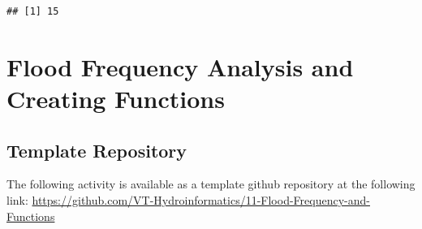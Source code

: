 \documentclass[
]{book}
\newenvironment{Shaded}{\begin{snugshade}}{\end{snugshade}}
\newcommand{\DecValTok}[1]{\textcolor[rgb]{0.00,0.00,0.81}{#1}}
\newcommand{\FunctionTok}[1]{\textcolor[rgb]{0.00,0.00,0.00}{#1}}
\newcommand{\NormalTok}[1]{#1}
\newcommand{\OtherTok}[1]{\textcolor[rgb]{0.56,0.35,0.01}{#1}}
\newcommand{\SpecialCharTok}[1]{\textcolor[rgb]{0.00,0.00,0.00}{#1}}
\begin{document}
\begin{Shaded}
\end{Shaded}

\begin{verbatim}
## [1] 15
\end{verbatim}

\hypertarget{floods}{%
\chapter{Flood Frequency Analysis and Creating Functions}\label{floods}}

\hypertarget{template-repository}{%
\section{Template Repository}\label{template-repository}}

The following activity is available as a template github repository at the following link: \url{https://github.com/VT-Hydroinformatics/11-Flood-Frequency-and-Functions}
\end{document}
